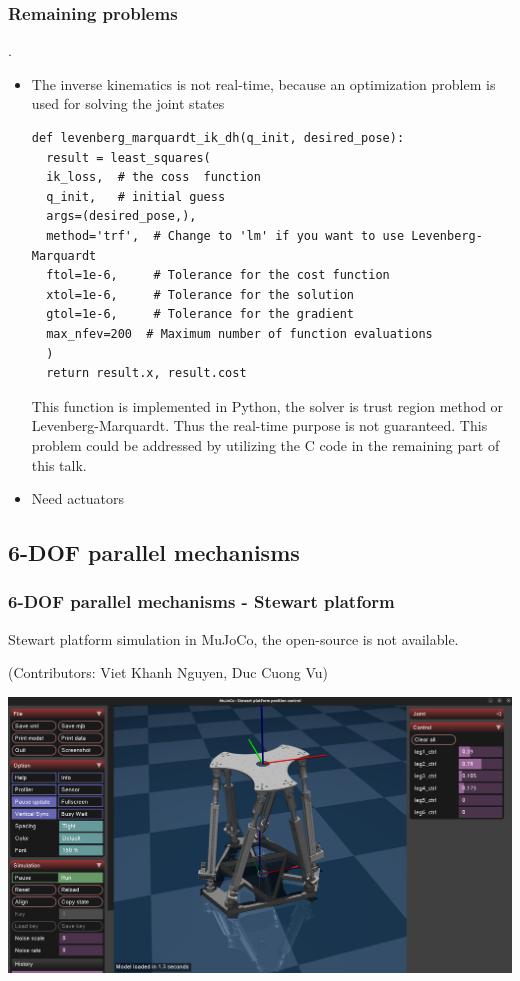 \documentclass[9pt]{beamer}
\begin{document}
	
		\begin{frame}[fragile]
			\frametitle{Remaining problems}
			.\begin{itemize}
				\item The inverse kinematics is not real-time, because an optimization problem is used for solving the joint states
				\begin{verbatim}
def levenberg_marquardt_ik_dh(q_init, desired_pose):
  result = least_squares(
  ik_loss, 	# the coss  function
  q_init, 	# initial guess
  args=(desired_pose,), 
  method='trf',  # Change to 'lm' if you want to use Levenberg-Marquardt
  ftol=1e-6,     # Tolerance for the cost function
  xtol=1e-6,     # Tolerance for the solution
  gtol=1e-6,     # Tolerance for the gradient
  max_nfev=200  # Maximum number of function evaluations
  )
  return result.x, result.cost
				\end{verbatim}
				This function is implemented in Python, the solver is trust region method or Levenberg-Marquardt. Thus the real-time purpose is not guaranteed. This problem could be addressed by utilizing the C code in the remaining part of this talk.
				\item Need actuators
			\end{itemize}
		\end{frame}
	
	
		\subsection{6-DOF parallel mechanisms}
			\begin{frame}
				\frametitle{6-DOF parallel mechanisms - Stewart platform}
				Stewart platform simulation in MuJoCo, the open-source is not available.
				
				(Contributors: Viet Khanh Nguyen, Duc Cuong Vu)
				
				\begin{center}
					\includegraphics[width=0.9\linewidth]{mujoco-stewart}
				\end{center}
				
			\end{frame}
		
\end{document}
